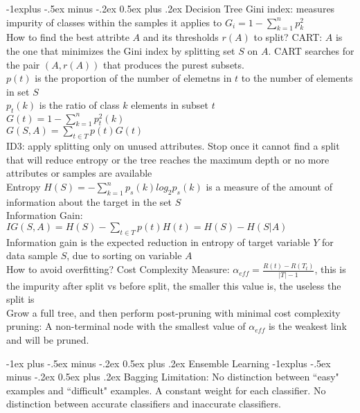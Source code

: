 \documentclass[10pt,landscape]{article}
\makeatletter
\renewcommand{\section}{\@startsection{section}{1}{0mm}%
                                {-1ex plus -.5ex minus -.2ex}%
                                {0.5ex plus .2ex}%
                                {\normalfont\large\bfseries}}
\renewcommand{\subsection}{\@startsection{subsection}{2}{0mm}%
                                {-1explus -.5ex minus -.2ex}%
                                {0.5ex plus .2ex}%
                                {\normalfont\normalsize\bfseries}}
\makeatother
\begin{document}
\begin{multicols}{4}
\subsection{Decision Tree}
Gini index: measures impurity of classes within the samples it applies to $G_i = 1-\sum_{k=1}^n p_k^2$\\
How to find the best attribte $A$ and its thresholds $r(A)$ to split? 
CART: $A$ is the one that minimizes the Gini index by splitting set $S$ on $A$. CART searches for the pair $(A, r(A))$ that produces the purest subsets.\\
$p(t)$ is the proportion of the number of elemetns in $t$ to the number of elements in set $S$\\
$p_t(k)$ is the ratio of class $k$ elements in subset $t$\\
$G(t) = 1 - \sum_{k=1}^n p_t^2 (k)$\\
$G(S, A) = \sum_{t \in T} p(t) G(t)$\\
ID3: apply splitting only on unused attributes. Stop once it cannot find a split that will reduce entropy or the tree reaches the maximum depth or no more attributes or samples are available\\
Entropy $H(S) = -\sum_{k=1}^n p_s(k) log_2p_s(k)$ is a measure of the amount of information about the target in the set $S$\\
Information Gain: $IG(S, A) = H(S) - \sum_{t\in T}p(t)H(t) = H(S) - H(S|A)$\\
Information gain is the expected reduction in entropy of target variable $Y$ for data sample $S$, due to sorting on variable $A$\\
How to avoid overfitting? Cost Complexity Measure: $\alpha_{eff} = \frac{R(t) - R(T_t)}{|T| - 1}$, this is the impurity after split vs before split, the smaller this value is, the useless the split is\\
Grow a full tree, and then perform post-pruning with minimal cost complexity pruning: A non-terminal node with the smallest value of $\alpha_{eff}$ is the weakest link and will be pruned. 

\section{Ensemble Learning}
\subsection{Bagging}
Limitation: No distinction between ``easy" examples and ``difficult" examples. A constant weight for each classifier. No distinction between accurate classifiers and inaccurate classifiers.


\end{multicols}
\end{document}
